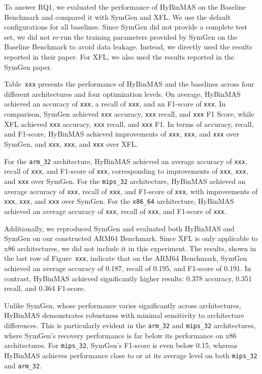 \documentclass[acmsmall,screen,review,anonymous]{acmart} %
\begin{document}
To answer RQ1, we evaluated the performance of HyBinMAS on the Baseline Benchmark and compared it with SymGen and XFL. We use the default configurations for all baselines. Since SymGen did not provide a complete test set, we did not re-run the training parameters provided by SymGen on the Baseline Benchmark to avoid data leakage. Instead, we directly used the results reported in their paper. For XFL, we also used the results reported in the SymGen paper.

Table~\texttt{xxx} presents the performance of HyBinMAS and the baselines across four different architectures and four optimization levels. On average, HyBinMAS achieved an accuracy of \texttt{xxx}, a recall of \texttt{xxx}, and an F1-score of \texttt{xxx}. In comparison, SymGen achieved \texttt{xxx} accuracy, \texttt{xxx} recall, and \texttt{xxx} F1 Score, while XFL achieved \texttt{xxx} accuracy, \texttt{xxx} recall, and \texttt{xxx} F1. In terms of accuracy, recall, and F1-score, HyBinMAS achieved improvements of \texttt{xxx}, \texttt{xxx}, and \texttt{xxx} over SymGen, and \texttt{xxx}, \texttt{xxx}, and \texttt{xxx} over XFL.

For the \texttt{arm\_32} architecture, HyBinMAS achieved an average accuracy of \texttt{xxx}, recall of \texttt{xxx}, and F1-score of \texttt{xxx}, corresponding to improvements of \texttt{xxx}, \texttt{xxx}, and \texttt{xxx} over SymGen. For the \texttt{mips\_32} architecture, HyBinMAS achieved an average accuracy of \texttt{xxx}, recall of \texttt{xxx}, and F1-score of \texttt{xxx}, with improvements of \texttt{xxx}, \texttt{xxx}, and \texttt{xxx} over SymGen. For the \texttt{x86\_64} architecture, HyBinMAS achieved an average accuracy of \texttt{xxx}, recall of \texttt{xxx}, and F1-score of \texttt{xxx}.


Additionally, we reproduced SymGen and evaluated both HyBinMAS and SymGen on our constructed ARM64 Benchmark. Since XFL is only applicable to x86 architectures, we did not include it in this experiment. The results, shown in the last row of Figure~\texttt{xxx}, indicate that on the ARM64 Benchmark, SymGen achieved an average accuracy of 0.187, recall of 0.195, and F1-score of 0.191. In contrast, HyBinMAS achieved significantly higher results: 0.378 accuracy, 0.351 recall, and 0.364 F1-score.

Unlike SymGen, whose performance varies significantly across architectures, HyBinMAS demonstrates robustness with minimal sensitivity to architecture differences. This is particularly evident in the \texttt{arm\_32} and \texttt{mips\_32} architectures, where SymGen’s recovery performance is far below its performance on x86 architectures. For \texttt{mips\_32}, SymGen’s F1-score is even below 0.15, whereas HyBinMAS achieves performance close to or at its average level on both \texttt{mips\_32} and \texttt{arm\_32}.
\end{document}
